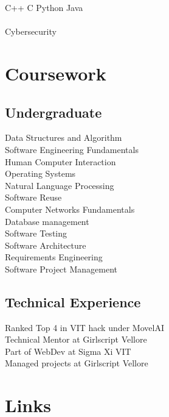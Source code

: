 \documentclass[]{deedy-resume-openfont}
\begin{document}
\begin{minipage}[t]{0.33\textwidth}
\textbullet C++ \textbullet{}  C  \textbullet{} Python \textbullet{} Java\\

         \\
\textbullet Cybersecurity     
\sectionsep


\section{Coursework}
\subsection{Undergraduate}
Data Structures and Algorithm \\
Software Engineering Fundamentals\\
Human Computer Interaction\\
Operating Systems \\
Natural Language Processing \\
Software Reuse \\
Computer Networks Fundamentals \\
Database management \\
Software Testing\\
Software Architecture\\
Requirements Engineering\\
Software Project Management\\
\sectionsep

\subsection{Technical Experience}
Ranked Top 4 in VIT hack under MovelAI \\
Technical Mentor at Girlscript Vellore \\
Part of WebDev at Sigma Xi VIT \\
Managed projects at Girlscript Vellore \\




\section{Links} 


\end{minipage}
\end{document}
